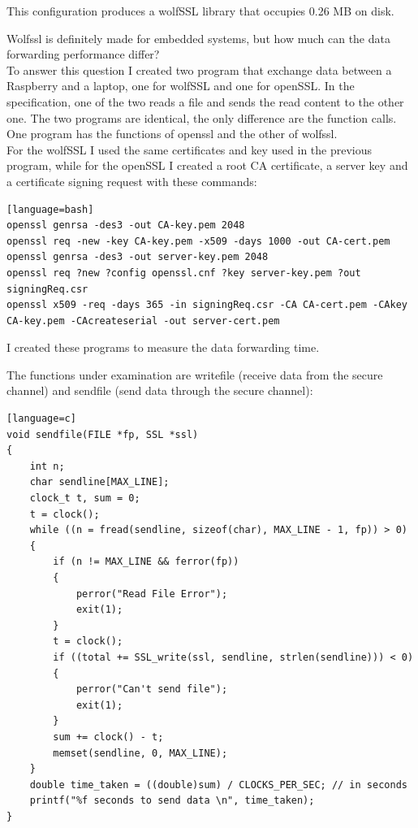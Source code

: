\documentclass[a4paper,12pt]{article}
\begin{document}
This configuration produces a wolfSSL library that occupies 0.26 MB on disk.

Wolfssl is definitely made for embedded systems, but how much can the data forwarding performance differ?
\\To answer this question I created two program that exchange data between a Raspberry and a laptop, one for wolfSSL and one for openSSL. In the specification, one of the two reads a file and sends the read content to the other one.
The two programs are identical, the only difference are the function calls. One program has the functions of openssl and the other of wolfssl.
\\For the wolfSSL I used the same certificates and key used in the previous program, while for the openSSL I created a root CA certificate, a server key and a certificate signing request with these commands:
\begin{lstlisting}[caption={openSSL commands},captionpos=b][language=bash]
openssl genrsa -des3 -out CA-key.pem 2048
openssl req -new -key CA-key.pem -x509 -days 1000 -out CA-cert.pem
openssl genrsa -des3 -out server-key.pem 2048
openssl req ?new ?config openssl.cnf ?key server-key.pem ?out signingReq.csr
openssl x509 -req -days 365 -in signingReq.csr -CA CA-cert.pem -CAkey CA-key.pem -CAcreateserial -out server-cert.pem
\end{lstlisting}

I created these programs to measure the data forwarding time.

The functions under examination are writefile (receive data from the secure channel) and sendfile (send data through the secure channel):

\begin{lstlisting}[caption={sendfile openSSL function},captionpos=b][language=c]
void sendfile(FILE *fp, SSL *ssl)
{
    int n;
    char sendline[MAX_LINE];
    clock_t t, sum = 0;
    t = clock();
    while ((n = fread(sendline, sizeof(char), MAX_LINE - 1, fp)) > 0)
    {
        if (n != MAX_LINE && ferror(fp))
        {
            perror("Read File Error");
            exit(1);
        }
        t = clock();
        if ((total += SSL_write(ssl, sendline, strlen(sendline))) < 0)
        {
            perror("Can't send file");
            exit(1);
        }
        sum += clock() - t;
        memset(sendline, 0, MAX_LINE);
    }
    double time_taken = ((double)sum) / CLOCKS_PER_SEC; // in seconds
    printf("%f seconds to send data \n", time_taken);
}
\end{lstlisting}
\end{document}
